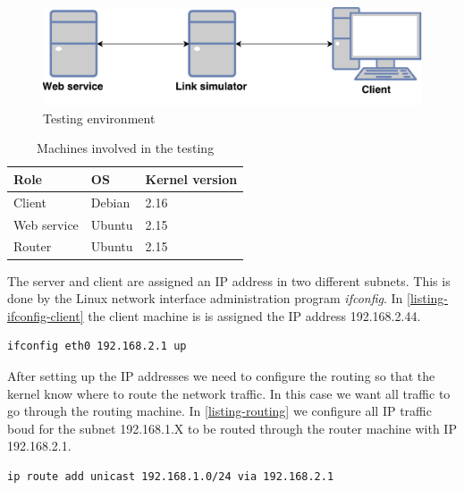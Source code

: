 \begin{figure}[h]
\includegraphics[scale=0.6]{images/testing_environment.pdf}
\caption{Testing environment}
\label{figure-testing-environment}
\end{figure}


\begin{table}[h]
\begin{tabular}{| l | l | l |}
\hline
  \textbf{Role} & \textbf{OS} & \textbf{Kernel version}\\ \hline
  Client & Debian & 2.16 \\ \hline
  Web service & Ubuntu & 2.15 \\ \hline
  Router & Ubuntu & 2.15 \\ \hline
\end{tabular}
\caption{Machines involved in the testing}
\label{table-machines}
\end{table}


The server and client are assigned an IP address in two different subnets.
This is done by the Linux network interface administration program
\textit{ifconfig}. In \cref{listing-ifconfig-client} the client machine is is
assigned the IP address 192.168.2.44.

\begin{lstlisting}[frame=single, caption="Configuring a network interface of the router", label=listing-ifconfig-client]
ifconfig eth0 192.168.2.1 up
\end{lstlisting}

After setting up the IP addresses we need to configure the routing so that the
kernel know where to route the network traffic. In this case we want all
traffic to go through the routing machine. In \cref{listing-routing} we
configure all IP traffic boud for the subnet 192.168.1.X to be routed through
the router machine with IP 192.168.2.1.

\begin{lstlisting}[frame=single, caption="Configuring routing rules for the client", label=listing-routing]
ip route add unicast 192.168.1.0/24 via 192.168.2.1
\end{lstlisting}


